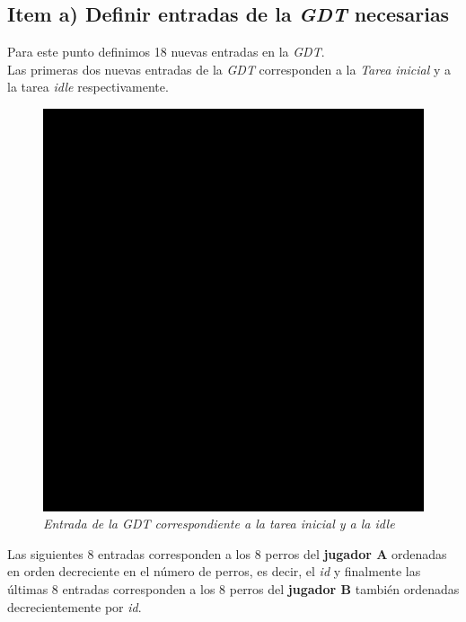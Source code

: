 \subsection{Item a) Definir entradas de la \textit{GDT} necesarias}
Para este punto definimos 18 nuevas entradas en la \textit{GDT}.\\

Las primeras dos nuevas entradas de la \textit{GDT} corresponden a la \textit{Tarea inicial} y a la tarea \textit{idle} respectivamente. 

\begin{figure}[H]
\begin{center}
\includegraphics[width=\linewidth]{ejercicio6/gdt_inicial_idle.png}
\caption{{\small \textit{Entrada de la \textit{GDT} correspondiente a la tarea inicial y a la idle }}}
\endminipage
\end{center}
\end{figure}

Las siguientes 8 entradas corresponden a los 8 perros del \textbf{jugador A} ordenadas en orden decreciente en el número de perros, es decir, el \textit{id} y finalmente las últimas 8 entradas corresponden a los 8 perros del \textbf{jugador B } también ordenadas decrecientemente por \textit{id}.\\

